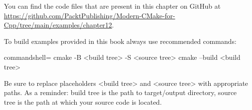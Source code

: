 You can find the code files that are present in this chapter on GitHub at \url{https://github.com/PacktPublishing/Modern-CMake-for-Cpp/tree/main/examples/chapter12}.

To build examples provided in this book always use recommended commands:

\begin{tcblisting}{commandshell={}}
cmake -B <build tree> -S <source tree>
cmake --build <build tree>
\end{tcblisting}

Be sure to replace placeholders <build tree> and <source tree> with appropriate paths. As a reminder: build tree is the path to target/output directory, source tree is the path at which your source code is located.